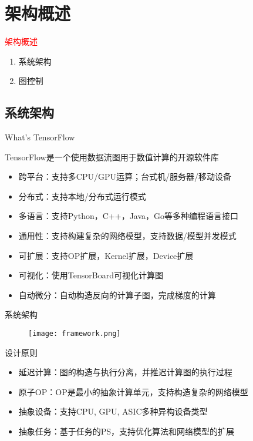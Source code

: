 \section{架构概述}
\label{sec:overview}

\begin{frame}
  \begin{center}
    \Huge{\textcolor{red}{架构概述}}
  \end{center}

  \begin{enumerate}
    \item \alert{系统架构}
    \item \alert{图控制}
  \end{enumerate}   
\end{frame}

\subsection{系统架构}

\begin{frame}{What's TensorFlow}
  \begin{block}{TensorFlow是一个使用数据流图用于数值计算的开源软件库}
    \begin{itemize}
      \item \alert{跨平台}：支持多CPU/GPU运算；台式机/服务器/移动设备
      \item \alert{分布式}：支持本地/分布式运行模式
      \item \alert{多语言}：支持Python，C++，Java，Go等多种编程语言接口
      \item \alert{通用性}：支持构建复杂的网络模型，支持数据/模型并发模式
      \item \alert{可扩展}：支持OP扩展，Kernel扩展，Device扩展
      \item \alert{可视化}：使用TensorBoard可视化计算图
      \item \alert{自动微分}：自动构造反向的计算子图，完成梯度的计算
    \end{itemize}
  \end{block}
\end{frame}

\begin{frame}{系统架构}
  \begin{figure}
    \centering
    \texttt{[image: framework.png]}
  \end{figure}
\end{frame}

\begin{frame}{设计原则}
    \begin{itemize}
      \item \alert{延迟计算}：图的构造与执行分离，并推迟计算图的执行过程
      \item \alert{原子OP}：OP是最小的抽象计算单元，支持构造复杂的网络模型
      \item \alert{抽象设备}：支持CPU, GPU, ASIC多种异构设备类型
      \item \alert{抽象任务}：基于任务的PS，支持优化算法和网络模型的扩展
    \end{itemize}
\end{frame}

